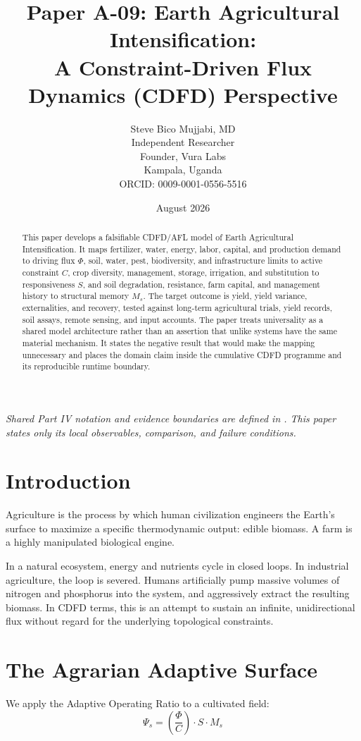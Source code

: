 \documentclass[11pt,a4paper]{article}
\title{\textbf{Paper A-09: Earth Agricultural Intensification:\\ A Constraint-Driven Flux Dynamics (CDFD) Perspective}}
\author{Steve Bico Mujjabi, MD\\
\small Independent Researcher\\
\small Founder, Vura Labs\\
\small Kampala, Uganda\\
\small ORCID: 0009-0001-0556-5516}
\date{August 2026}
\begin{document}
\maketitle

\noindent\textit{Shared Part IV notation and evidence boundaries are defined in . This paper states only its local observables, comparison, and failure conditions.}


\begin{abstract}
This paper develops a falsifiable CDFD/AFL model of Earth Agricultural Intensification. It maps fertilizer, water, energy, labor, capital, and production demand to driving flux $\Phi$, soil, water, pest, biodiversity, and infrastructure limits to active constraint $C$, crop diversity, management, storage, irrigation, and substitution to responsiveness $S$, and soil degradation, resistance, farm capital, and management history to structural memory $M_s$. The target outcome is yield, yield variance, externalities, and recovery, tested against long-term agricultural trials, yield records, soil assays, remote sensing, and input accounts. The paper treats universality as a shared model architecture rather than an assertion that unlike systems have the same material mechanism. It states the negative result that would make the mapping unnecessary and places the domain claim inside the cumulative CDFD programme and its reproducible runtime boundary.
\end{abstract}

\section{Introduction}

Agriculture is the process by which human civilization engineers the Earth's surface to maximize a specific thermodynamic output: edible biomass. A farm is a highly manipulated biological engine.

In a natural ecosystem, energy and nutrients cycle in closed loops. In industrial agriculture, the loop is severed. Humans artificially pump massive volumes of nitrogen and phosphorus into the system, and aggressively extract the resulting biomass. In CDFD terms, this is an attempt to sustain an infinite, unidirectional flux without regard for the underlying topological constraints.

\section{The Agrarian Adaptive Surface}
We apply the Adaptive Operating Ratio to a cultivated field:
\begin{equation}
    \Psi_s = \left( \frac{\Phi}{C} \right) \cdot S \cdot M_s
\end{equation}
\end{document}
